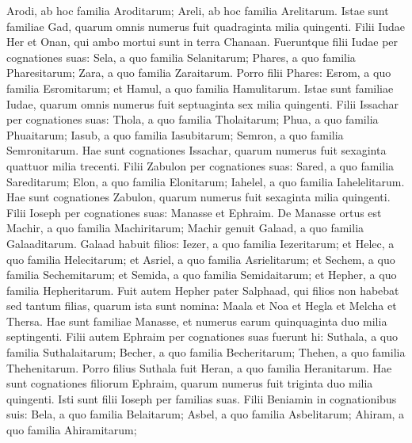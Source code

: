 \begin{biblechapter}
\begin{biblechapter}
\begin{biblechapter}
\begin{biblechapter}
\begin{biblechapter}
\begin{biblechapter}
\begin{biblechapter}
\begin{biblechapter}
\begin{biblechapter}
\begin{biblechapter}
\begin{biblechapter}
\begin{biblechapter}
\begin{biblechapter}
\begin{biblechapter}
\begin{biblechapter}
\begin{biblechapter}
\begin{biblechapter}
\begin{biblechapter}
\begin{biblechapter}
\begin{biblechapter}
\begin{biblechapter}
\begin{biblechapter}
\begin{biblechapter}
\begin{biblechapter}
\begin{biblechapter}
\begin{biblechapter}
\verse Arodi, ab hoc familia Aroditarum; Areli, ab hoc familia Arelitarum. 
\verse Istae sunt familiae Gad, quarum omnis numerus fuit quadraginta milia quingenti.
 \verse Filii Iudae Her et Onan, qui ambo mortui sunt in terra Chanaan. 
\verse Fueruntque filii Iudae per cognationes suas: Sela, a quo familia Selanitarum; Phares, a quo familia Pharesitarum; Zara, a quo familia Zaraitarum. 
\verse Porro filii Phares: Esrom, a quo familia Esromitarum; et Hamul, a quo familia Hamulitarum. 
\verse Istae sunt familiae Iudae, quarum omnis numerus fuit septuaginta sex milia quingenti.
 \verse Filii Issachar per cognationes suas: Thola, a quo familia Tholaitarum; Phua, a quo familia Phuaitarum; 
\verse Iasub, a quo familia Iasubitarum; Semron, a quo familia Semronitarum. 
\verse Hae sunt cognationes Issachar, quarum numerus fuit sexaginta quattuor milia trecenti.
 \verse Filii Zabulon per cognationes suas: Sared, a quo familia Sareditarum; Elon, a quo familia Elonitarum; Iahelel, a quo familia Iahelelitarum. 
\verse Hae sunt cognationes Zabulon, quarum numerus fuit sexaginta milia quingenti.
 \verse Filii Ioseph per cognationes suas: Manasse et Ephraim. 
\verse De Manasse ortus est Machir, a quo familia Machiritarum; Machir genuit Galaad, a quo familia Galaaditarum. 
\verse Galaad habuit filios: Iezer, a quo familia Iezeritarum; et Helec, a quo familia Helecitarum; 
\verse et Asriel, a quo familia Asrielitarum; et Sechem, a quo familia Sechemitarum; 
\verse et Semida, a quo familia Semidaitarum; et Hepher, a quo familia Hepheritarum. 
\verse Fuit autem Hepher pater Salphaad, qui filios non habebat sed tantum filias, quarum ista sunt nomina: Maala et Noa et Hegla et Melcha et Thersa. 
\verse Hae sunt familiae Manasse, et numerus earum quinquaginta duo milia septingenti.
 \verse Filii autem Ephraim per cognationes suas fuerunt hi: Suthala, a quo familia Suthalaitarum; Becher, a quo familia Becheritarum; Thehen, a quo familia Thehenitarum. 
\verse Porro filius Suthala fuit Heran, a quo familia Heranitarum. 
 \verse Hae sunt cognationes filiorum Ephraim, quarum numerus fuit triginta duo milia quingenti. Isti sunt filii Ioseph per familias suas.
 \verse Filii Beniamin in cognationibus suis: Bela, a quo familia Belaitarum; Asbel, a quo familia Asbelitarum; Ahiram, a quo familia Ahiramitarum; 

\end{biblechapter}
\end{biblechapter}
\end{biblechapter}
\end{biblechapter}
\end{biblechapter}
\end{biblechapter}
\end{biblechapter}
\end{biblechapter}
\end{biblechapter}
\end{biblechapter}
\end{biblechapter}
\end{biblechapter}
\end{biblechapter}
\end{biblechapter}
\end{biblechapter}
\end{biblechapter}
\end{biblechapter}
\end{biblechapter}
\end{biblechapter}
\end{biblechapter}
\end{biblechapter}
\end{biblechapter}
\end{biblechapter}
\end{biblechapter}
\end{biblechapter}
\end{biblechapter}
